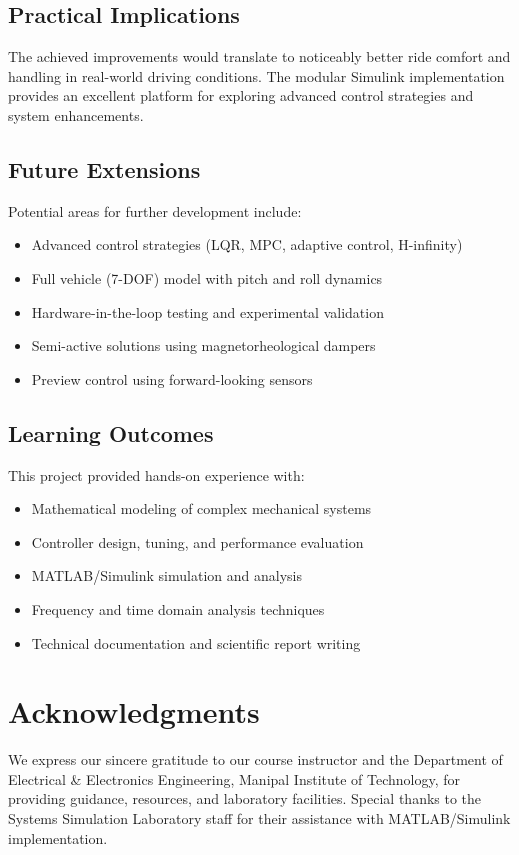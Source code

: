 \documentclass[12pt,a4paper]{article}
\begin{document}
\subsection{Practical Implications}
The achieved improvements would translate to noticeably better ride comfort and handling in real-world driving conditions. The modular Simulink implementation provides an excellent platform for exploring advanced control strategies and system enhancements.

\subsection{Future Extensions}
Potential areas for further development include:
\begin{itemize}
    \item Advanced control strategies (LQR, MPC, adaptive control, H-infinity)
    \item Full vehicle (7-DOF) model with pitch and roll dynamics
    \item Hardware-in-the-loop testing and experimental validation
    \item Semi-active solutions using magnetorheological dampers
    \item Preview control using forward-looking sensors
\end{itemize}

\subsection{Learning Outcomes}
This project provided hands-on experience with:
\begin{itemize}
    \item Mathematical modeling of complex mechanical systems
    \item Controller design, tuning, and performance evaluation
    \item MATLAB/Simulink simulation and analysis
    \item Frequency and time domain analysis techniques
    \item Technical documentation and scientific report writing
\end{itemize}

\section*{Acknowledgments}

We express our sincere gratitude to our course instructor and the Department of Electrical \& Electronics Engineering, Manipal Institute of Technology, for providing guidance, resources, and laboratory facilities. Special thanks to the Systems Simulation Laboratory staff for their assistance with MATLAB/Simulink implementation.
\end{document}
